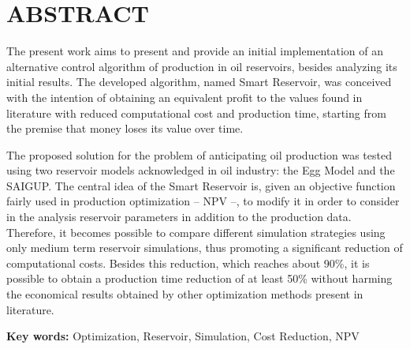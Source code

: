 \chapter[ABSTRACT]{ABSTRACT}
{
The present work aims to present and provide an initial implementation of an alternative control algorithm of production in oil reservoirs, besides analyzing its initial results. The developed algorithm, named Smart Reservoir, was conceived with the intention of obtaining an equivalent profit to the values found in literature with reduced computational cost and production time, starting from the premise that money loses its value over time.

The proposed solution for the problem of anticipating oil production was tested using two reservoir models acknowledged in oil industry: the Egg Model and the SAIGUP. The central idea of the Smart Reservoir is, given an objective function fairly used in production optimization -- NPV --, to modify it in order to consider in the analysis reservoir parameters in addition to the production data. Therefore, it becomes possible to compare different simulation strategies using only medium term reservoir simulations, thus promoting a significant reduction of computational costs. Besides this reduction, which reaches about 90\%, it is possible to obtain a production time reduction of at least 50\% without harming the economical results obtained by other optimization methods present in literature.
 
\textbf{Key words:} Optimization, Reservoir, Simulation, Cost Reduction, NPV
}